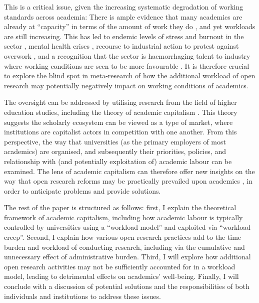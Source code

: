 \documentclass[ authordate, meta, issue]{jote-new-article}
\begin{document}
This is a critical issue, given the increasing systematic degradation of working standards across academia: There is ample evidence that many academics are already at “capacity” in terms of the amount of work they do \parencites{Long2020}, and yet workloads are still increasing. This has led to endemic levels of stress and burnout in the sector \parencites{Urbina-Garcia2020}, mental health crises \parencites{Nicholls2022}, recourse to industrial action to protest against overwork \parencites{University2022}, and a recognition that the sector is haemorrhaging talent to industry where working conditions are seen to be more favourable \parencites{Gewin2022}{Seidl2016}. It is therefore crucial to explore the blind spot in meta-research of how the additional workload of open research may potentially negatively impact on working conditions of academics.



The oversight can be addressed by utilising research from the field of higher education studies, including the theory of academic capitalism \parencites{Jessop2018}. This theory suggests the scholarly ecosystem can be viewed as a type of market, where institutions are capitalist actors in competition with one another. From this perspective, the way that universities (as the primary employers of most academics) are organised, and subsequently their priorities, policies, and relationship with (and potentially exploitation of) academic labour can be examined. The lens of academic capitalism can therefore offer new insights on the way that open research reforms may be practically prevailed upon academics \parencites{Hostler2022}, in order to anticipate problems and provide solutions.



The rest of the paper is structured as follows: first, I explain the theoretical framework of academic capitalism, including how academic labour is typically controlled by universities using a “workload model” and exploited via “workload creep”. Second, I explain how various open research practices add to the time burden and workload of conducting research, including via the cumulative and unnecessary effect of administrative burden. Third, I will explore how additional open research activities may not be sufficiently accounted for in a workload model, leading to detrimental effects on academics’ well-being. Finally, I will conclude with a discussion of potential solutions and the responsibilities of both individuals and institutions to address these issues.
\end{document}
